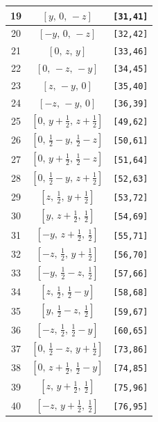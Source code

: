 \documentclass[fleqn,8pt]{jsarticle}
\begin{document}
\begin{longtable}{ccc}
19 & $\left[ y,\, 0,\, - z \right]$ & {\tt [31,41]} \\ \hline
20 & $\left[ - y,\, 0,\, - z \right]$ & {\tt [32,42]} \\ \hline
21 & $\left[ 0,\, z,\, y \right]$ & {\tt [33,46]} \\ \hline
22 & $\left[ 0,\, - z,\, - y \right]$ & {\tt [34,45]} \\ \hline
23 & $\left[ z,\, - y,\, 0 \right]$ & {\tt [35,40]} \\ \hline
24 & $\left[ - z,\, - y,\, 0 \right]$ & {\tt [36,39]} \\ \hline
25 & $\left[ 0,\, y + \frac{1}{2},\, z + \frac{1}{2} \right]$ & {\tt [49,62]} \\ \hline
26 & $\left[ 0,\, \frac{1}{2} - y,\, \frac{1}{2} - z \right]$ & {\tt [50,61]} \\ \hline
27 & $\left[ 0,\, y + \frac{1}{2},\, \frac{1}{2} - z \right]$ & {\tt [51,64]} \\ \hline
28 & $\left[ 0,\, \frac{1}{2} - y,\, z + \frac{1}{2} \right]$ & {\tt [52,63]} \\ \hline
29 & $\left[ z,\, \frac{1}{2},\, y + \frac{1}{2} \right]$ & {\tt [53,72]} \\ \hline
30 & $\left[ y,\, z + \frac{1}{2},\, \frac{1}{2} \right]$ & {\tt [54,69]} \\ \hline
31 & $\left[ - y,\, z + \frac{1}{2},\, \frac{1}{2} \right]$ & {\tt [55,71]} \\ \hline
32 & $\left[ - z,\, \frac{1}{2},\, y + \frac{1}{2} \right]$ & {\tt [56,70]} \\ \hline
33 & $\left[ - y,\, \frac{1}{2} - z,\, \frac{1}{2} \right]$ & {\tt [57,66]} \\ \hline
34 & $\left[ z,\, \frac{1}{2},\, \frac{1}{2} - y \right]$ & {\tt [58,68]} \\ \hline
35 & $\left[ y,\, \frac{1}{2} - z,\, \frac{1}{2} \right]$ & {\tt [59,67]} \\ \hline
36 & $\left[ - z,\, \frac{1}{2},\, \frac{1}{2} - y \right]$ & {\tt [60,65]} \\ \hline
37 & $\left[ 0,\, \frac{1}{2} - z,\, y + \frac{1}{2} \right]$ & {\tt [73,86]} \\ \hline
38 & $\left[ 0,\, z + \frac{1}{2},\, \frac{1}{2} - y \right]$ & {\tt [74,85]} \\ \hline
39 & $\left[ z,\, y + \frac{1}{2},\, \frac{1}{2} \right]$ & {\tt [75,96]} \\ \hline
40 & $\left[ - z,\, y + \frac{1}{2},\, \frac{1}{2} \right]$ & {\tt [76,95]} \\ \hline

\end{longtable}
\end{document}
